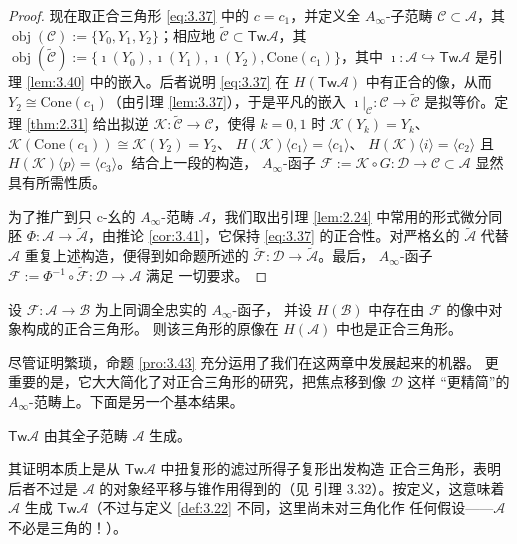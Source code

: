 \begin{proof}
现在取正合三角形 \eqref{eq:3.37} 中的 $c=c_1$，并定义全 $A_\infty$-子范畴
$\mathcal C\subset\mathcal A$，其
$\operatorname{obj}(\mathcal C):=\{Y_0,Y_1,Y_2\}$；相应地
$\tilde{\mathcal C}\subset\mathsf{Tw}\mathcal A$，其
$\operatorname{obj}(\tilde{\mathcal C}):=\{\imath(Y_0),\imath(Y_1),
\imath(Y_2),\mathrm{Cone}(c_1)\}$，其中
$\imath:\mathcal A\hookrightarrow\mathsf{Tw}\mathcal A$ 是引理 \ref{lem:3.40}
中的嵌入。后者说明 \eqref{eq:3.37} 在 $H(\mathsf{Tw}\mathcal A)$ 中有正合的像，从而
$Y_2\cong\mathrm{Cone}(c_1)$（由引理 \ref{lem:3.37}），于是平凡的嵌入
$\imath|_{\mathcal C}:\mathcal C\to\tilde{\mathcal C}$ 是拟等价。定理
\ref{thm:2.31} 给出拟逆 $\mathcal K:\tilde{\mathcal C}\to\mathcal C$，使得
$k=0,1$ 时 $\mathcal K(Y_k)=Y_k$、
$\mathcal K(\mathrm{Cone}(c_1))\cong\mathcal K(Y_2)=Y_2$、
$H(\mathcal K)\langle c_1\rangle=\langle c_1\rangle$、
$H(\mathcal K)\langle i\rangle=\langle c_2\rangle$ 且
$H(\mathcal K)\langle p\rangle=\langle c_3\rangle$。结合上一段的构造，
$A_\infty$-函子
$\mathcal F:=\mathcal K\circ G:\mathcal D\to\mathcal C\subset\mathcal A$
显然具有所需性质。

为了推广到只 c-幺的 $A_\infty$-范畴 $\mathcal A$，我们取出引理 \ref{lem:2.24}
中常用的形式微分同胚 $\Phi:\mathcal A\to\tilde{\mathcal A}$，由推论
\ref{cor:3.41}，它保持 \eqref{eq:3.37} 的正合性。对严格幺的 $\tilde{\mathcal A}$ 代替
$\mathcal A$ 重复上述构造，便得到如命题所述的
$\tilde{\mathcal F}:\mathcal D\to\tilde{\mathcal A}$。最后，
$A_\infty$-函子
$\mathcal F:=\Phi^{-1}\circ\tilde{\mathcal F}:\mathcal D\to\mathcal A$ 满足
一切要求。
\end{proof}

\begin{Cor}\label{cor:3.44}
设 $\mathcal F:\mathcal A\to\mathcal B$ 为上同调全忠实的 $A_\infty$-函子，
并设 $H(\mathcal B)$ 中存在由 $\mathcal F$ 的像中对象构成的正合三角形。
则该三角形的原像在 $H(\mathcal A)$ 中也是正合三角形。
\end{Cor}

尽管证明繁琐，命题 \ref{pro:3.43} 充分运用了我们在这两章中发展起来的机器。
更重要的是，它大大简化了对正合三角形的研究，把焦点移到像 $\mathcal D$ 这样
“更精简”的 $A_\infty$-范畴上。下面是另一个基本结果。

\begin{Lem}\label{lem:3.45}
$\mathsf{Tw}\mathcal A$ 由其全子范畴 $\mathcal A$ 生成。
\end{Lem}

其证明本质上是从 $\mathsf{Tw}\mathcal A$ 中扭复形的滤过所得子复形出发构造
正合三角形，表明后者不过是 $\mathcal A$ 的对象经平移与锥作用得到的（见
\cite{Sei08} 引理 3.32）。按定义，这意味着 $\mathcal A$ 生成
$\mathsf{Tw}\mathcal A$（不过与定义 \ref{def:3.22} 不同，这里尚未对三角化作
任何假设——$\mathcal A$ 不必是三角的！）。

